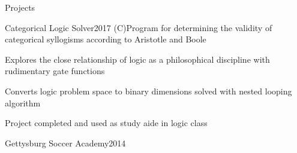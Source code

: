 \documentclass{resume} %
\begin{document}
\begin{rSection}{Projects}

\begin{rWorkSubsection}{Categorical Logic Solver}{2017 (C)}{Program for determining the validity of categorical syllogisms according to Aristotle and Boole}{}
\item Explores the close relationship of logic as a philosophical discipline with rudimentary gate functions
\item Converts logic problem space to binary dimensions solved with nested looping algorithm
\item Project completed and used as study aide in logic class
\end{rWorkSubsection}\vspace{-0.5em}

\iffalse
\begin{rWorkSubsection}{Super Chess}{2009 (Visual Basic, AutoCAD)}{Game platform for parsing strategic thinking from rule learning}{}
\item A multivariate chess-like board game developed to explore the divorce of strategy from experience
\item Uses plethora of user and randomly chosen game rule variables to build continually unique game play
\item Coded in Visual Basic using AutoCAD scripting and modelling as {\em ad hoc} graphics engine
\item Future work will rewrite game for a new platform
\end{rWorkSubsection}\vspace{-0.5em}
\fi
\iffalse
\begin{rWorkSubsection}{Project Management Backend}{2019 - ongoing (C++)}{Versatile task management backend}{}
\item Uses C-language pointers to structure task dependency and link ancillary information to appropriate parent structures
\item Explores integration of common database tools with linked list programmatic representation
\end{rWorkSubsection}\vspace{-0.5em}
\fi
\iffalse
\begin{rWorkSubsection}{Curiculum Vitea}{2017 - ongoing (\LaTeX)}{This resum\'{e} that you're reading right now!}{}
\item Uses custom .cls file to streamline parsing of broad CV into job-specific resum\'{e}s
\end{rWorkSubsection}\vspace{-0.5em}
\fi
\iffalse
\begin{rWorkSubsection}{Gettysburg Soccer Academy}{2014}{}{}
\item 
\end{rWorkSubsection}\vspace{-0.5em}


\end{rSection}
\end{document}
